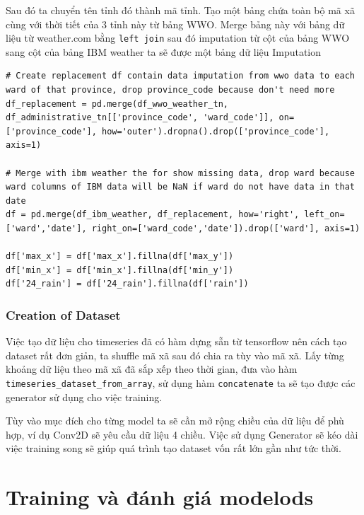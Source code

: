 \documentclass{article}
\begin{document}
Sau đó ta chuyển tên tỉnh đó thành mã tỉnh. Tạo một bảng chứa toàn bộ mã xã cùng với thời tiết của 3 tỉnh này từ bảng WWO. Merge bảng này với bảng dữ liệu từ weather.com bằng \texttt{left join} sau đó imputation từ cột của bảng WWO sang cột của bảng IBM weather ta sẽ được một bảng dữ liệu Imputation
\begin{verbatim}
# Create replacement df contain data imputation from wwo data to each ward of that province, drop province_code because don't need more
df_replacement = pd.merge(df_wwo_weather_tn, df_administrative_tn[['province_code', 'ward_code']], on=['province_code'], how='outer').dropna().drop(['province_code'], axis=1)

# Merge with ibm weather the for show missing data, drop ward because ward columns of IBM data will be NaN if ward do not have data in that date
df = pd.merge(df_ibm_weather, df_replacement, how='right', left_on=['ward','date'], right_on=['ward_code','date']).drop(['ward'], axis=1)

df['max_x'] = df['max_x'].fillna(df['max_y'])
df['min_x'] = df['min_x'].fillna(df['min_y'])
df['24_rain'] = df['24_rain'].fillna(df['rain'])
\end{verbatim}

\subsubsection{Creation of Dataset}

\qquad Việc tạo dữ liệu cho timeseries đã có hàm dựng sẵn từ tensorflow nên cách tạo dataset rất đơn giản, ta shuffle mã xã sau đó chia ra tùy vào mã xã. Lấy từng khoảng dữ liệu theo mã xã đã sắp xếp theo thời gian, đưa vào hàm \texttt{timeseries\_dataset\_from\_array}, sử dụng hàm \texttt{concatenate} ta sẽ tạo được các generator sử dụng cho việc training.

Tùy vào mục đích cho từng model ta sẽ cần mở rộng chiều của dữ liệu để phù hợp, ví dụ Conv2D sẽ yêu cầu dữ liệu 4 chiều. Việc sử dụng Generator sẽ kéo dài việc training song sẽ giúp quá trình tạo dataset vốn rất lớn gần như tức thời.

\section{Training và đánh giá modelods}
\end{document}
